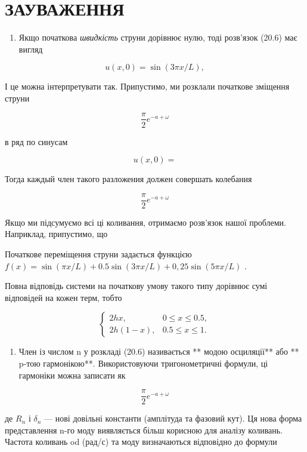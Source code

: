 \documentclass[
  ukrainian,
]{article}
\author{}
\date{}
\providecommand{\tightlist}{%
  \setlength{\itemsep}{0pt}\setlength{\parskip}{0pt}}
\begin{document}
\section{ЗАУВАЖЕННЯ}\label{ux437ux430ux443ux432ux430ux436ux435ux43dux43dux44f}

\begin{enumerate}
\def\labelenumi{\arabic{enumi}.}
\tightlist
\item
  Якщо початкова \emph{швидкість} струни дорівнює нулю, тоді розв'язок
  (20.6) має вигляд
\end{enumerate}

\[
u(x, 0) = \sin(3\pi x/L),
\]

І це можна інтерпретувати так. Припустимо, ми розклали початкове
зміщення струни

\[
\frac{\pi}{2} e^{-a+\omega}
\]

в ряд по синусам

\[
u(x, 0) =
\]

Тогда каждый член такого разложения должен совершать колебания

\[
\frac{\pi}{2} e^{-a+\omega}
\]

Якщо ми підсумуємо всі ці коливання, отримаємо розв'язок нашої проблеми.
Наприклад, припустимо, що

Початкове переміщення струни задається функцією
\(f(x) = \sin(\pi x/L) + 0.5 \sin(3\pi x/ L) + 0,25 \sin(5\pi x/L)\) .

Повна відповідь системи на початкову умову такого типу дорівнює сумі
відповідей на кожен терм, тобто

\[
\begin{cases} 2hx, & 0 \le x \le 0.5, \\ 2h(1-x), & 0.5 \le x \le 1. \end{cases}
\]

\begin{enumerate}
\def\labelenumi{\arabic{enumi}.}
\setcounter{enumi}{1}
\tightlist
\item
  Член із числом n у розкладі (20.6) називається ** модою осциляції**
  або ** p-тою гармонікою**. Використовуючи тригонометричні формули, ці
  гармоніки можна записати як
\end{enumerate}

\[
\frac{\pi}{2} e^{-a+\omega}
\]

де \(R_n\) і \(\delta_n\) --- нові довільні константи (амплітуда та
фазовий кут). Ця нова форма представлення n-го моду виявляється більш
корисною для аналізу коливань. Частота коливань od (рад/с) та моду
визначаються відповідно до формули
\end{document}
